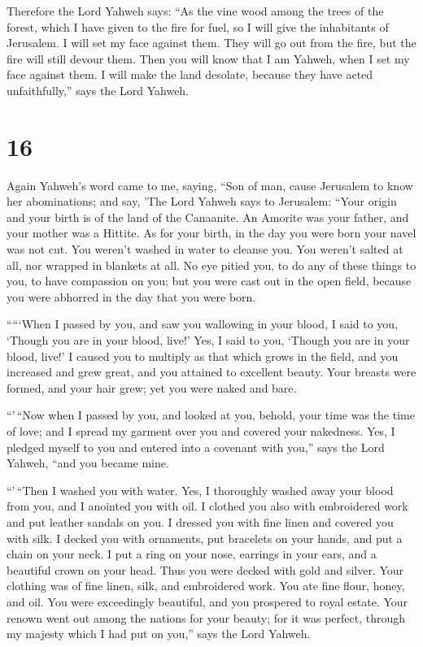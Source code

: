  Therefore the Lord Yahweh says: ``As the vine wood among
the trees of the forest, which I have given to the fire for fuel, so I
will give the inhabitants of Jerusalem.  I will set my
face against them. They will go out from the fire, but the fire will
still devour them. Then you will know that I am Yahweh, when I set my
face against them.  I will make the land desolate, because
they have acted unfaithfully,'' says the Lord Yahweh.

\hypertarget{section-14}{%
\section{16}\label{section-14}}

 Again Yahweh's word came to me, saying, 
``Son of man, cause Jerusalem to know her abominations; 
and say, 'The Lord Yahweh says to Jerusalem: ``Your origin and your
birth is of the land of the Canaanite. An Amorite was your father, and
your mother was a Hittite.  As for your birth, in the day
you were born your navel was not cut. You weren't washed in water to
cleanse you. You weren't salted at all, nor wrapped in blankets at all.
 No eye pitied you, to do any of these things to you, to
have compassion on you; but you were cast out in the open field, because
you were abhorred in the day that you were born.

 `````When I passed by you, and saw you wallowing in your
blood, I said to you, `Though you are in your blood, live!' Yes, I said
to you, `Though you are in your blood, live!'  I caused
you to multiply as that which grows in the field, and you increased and
grew great, and you attained to excellent beauty. Your breasts were
formed, and your hair grew; yet you were naked and bare.

 ``'\,``Now when I passed by you, and looked at you,
behold, your time was the time of love; and I spread my garment over you
and covered your nakedness. Yes, I pledged myself to you and entered
into a covenant with you,'' says the Lord Yahweh, ``and you became mine.

 ``'\,``Then I washed you with water. Yes, I thoroughly
washed away your blood from you, and I anointed you with oil.
 I clothed you also with embroidered work and put leather
sandals on you. I dressed you with fine linen and covered you with silk.
 I decked you with ornaments, put bracelets on your
hands, and put a chain on your neck.  I put a ring on
your nose, earrings in your ears, and a beautiful crown on your head.
 Thus you were decked with gold and silver. Your clothing
was of fine linen, silk, and embroidered work. You ate fine flour,
honey, and oil. You were exceedingly beautiful, and you prospered to
royal estate.  Your renown went out among the nations for
your beauty; for it was perfect, through my majesty which I had put on
you,'' says the Lord Yahweh.

